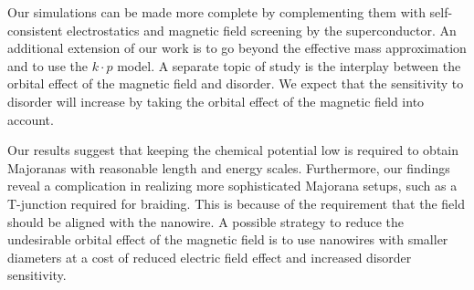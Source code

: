 Our simulations can be made more complete by complementing them with self-consistent electrostatics and magnetic field screening by the superconductor.
An additional extension of our work is to go beyond the effective mass approximation and to use the $k \cdot p$ model.
A separate topic of study is the interplay between the orbital effect of the magnetic field and disorder.
We expect that the sensitivity to disorder will increase by taking the orbital effect of the magnetic field into account.

Our results suggest that keeping the chemical potential low is required to obtain Majoranas with reasonable length and energy scales.
Furthermore, our findings reveal a complication in realizing more sophisticated Majorana setups, such as a T-junction required for braiding.
This is because of the requirement that the field should be aligned with the nanowire.
A possible strategy to reduce the undesirable orbital effect of the magnetic field is to use nanowires with smaller diameters at a cost of reduced electric field effect and increased disorder sensitivity.

